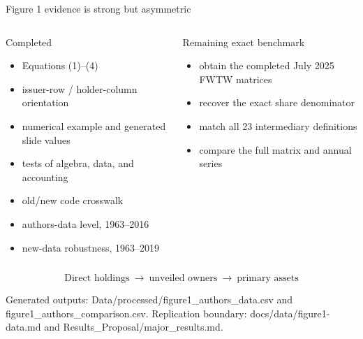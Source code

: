 \documentclass[aspectratio=169,11pt]{beamer}
\newcommand{\source}[1]{%
  \vfill
  {\color{MSSGray}\fontsize{6.5}{7.5}\selectfont #1\par}
}
\begin{document}
\begin{frame}{Figure 1 evidence is strong but asymmetric}
  \fontsize{9.2}{10.8}\selectfont
  \begin{columns}[T,onlytextwidth]
    \begin{block}{Completed}
      \begin{itemize}
        \item Equations (1)--(4)
        \item issuer-row / holder-column orientation
        \item numerical example and generated slide values
        \item tests of algebra, data, and accounting
        \item old/new code crosswalk
        \item authors-data level, 1963--2016
        \item new-data robustness, 1963--2019
      \end{itemize}
    \end{block}

    \begin{block}{Remaining exact benchmark}
      \begin{itemize}
        \item obtain the completed July 2025 FWTW matrices
        \item recover the exact share denominator
        \item match all 23 intermediary definitions
        \item compare the full matrix and annual series
      \end{itemize}
    \end{block}
  \end{columns}
  \vspace{0.12cm}
  \[
    \boxed{\text{Direct holdings}\ \longrightarrow\
    \text{unveiled owners}\ \longrightarrow\
    \text{primary assets}}
  \]
  \source{Generated outputs: Data/processed/figure1\_authors\_data.csv and figure1\_authors\_comparison.csv. Replication boundary: docs/data/figure1-data.md and Results\_Proposal/major\_results.md.}
\end{frame}
\end{document}
